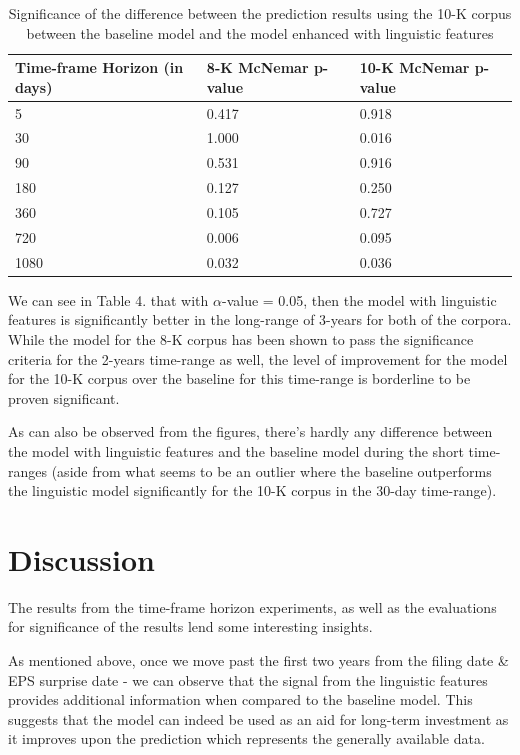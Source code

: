 \documentclass[11pt,a4paper]{article}
\begin{document}
\begin{table}[h!]
\begin{adjustwidth}{0in}{0in}
\begin{tabular}{ |p{2cm}| p{2.5cm} p{2.5cm}|  }
 \hline
 Time-frame Horizon (in days)& 8-K McNemar p-value & 10-K McNemar p-value\\
 \hline
5    & 0.417 & 0.918\\
30   & 1.000 & 0.016\\ %
90   & 0.531 & 0.916\\
180  & 0.127 & 0.250\\
360  & 0.105 & 0.727\\
720  & 0.006 & 0.095\\
1080 & 0.032 & 0.036\\
 \hline
\end{tabular}

\caption{Significance of the difference between the prediction results using the 10-K corpus between the baseline model and the model enhanced with linguistic features}
\end{adjustwidth}
\label{table:4}
\end{table}

We can see in Table 4. that with $\alpha$-value = 0.05, then the model with linguistic features is significantly better in the long-range of 3-years for both of the corpora. While the model for the 8-K corpus has been shown to pass the significance criteria for the 2-years time-range as well, the level of improvement for the model for the 10-K corpus over the baseline for this time-range is borderline to be proven significant.

As can also be observed from the figures,  there's hardly any difference between the model with linguistic features and the baseline model during the short time-ranges (aside from what seems to be an outlier where the baseline outperforms the linguistic model significantly for the 10-K corpus in the 30-day time-range).

\section{Discussion}

The results from the time-frame horizon experiments, as well as the evaluations for significance of the results lend some interesting insights. 

As mentioned above, once we move past the first two years from the filing date \& EPS surprise date - we can observe that the signal from the linguistic features provides additional information when compared to the baseline model. This suggests that the model can indeed be used as an aid for long-term investment as it improves upon the prediction which represents the generally available data.
\end{document}
